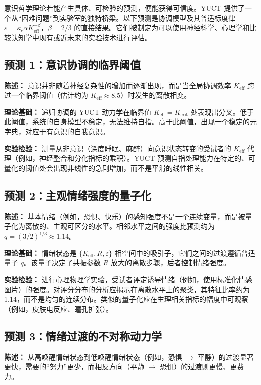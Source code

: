 \documentclass[12pt,a4paper]{article}
\begin{document}
	意识哲学理论若能产生具体、可检验的预测，便能获得可信度。YUCT 提供了一个从“困难问题”到实验室的独特桥梁。以下预测是协调模型及其普适标度律 \(\varepsilon = \kappa_c \alpha K_{\mathrm{eff}}^{-\beta}\)，\(\beta = 2/3\) 的直接结果。它们被制定为可以使用神经科学、心理学和比较认知学中现有或近未来的实验技术进行评估。
	
	\subsection{预测 1：意识协调的临界阈值}
	
	\textbf{陈述：} 意识并非随着神经复杂性的增加而逐渐出现，而是当全局协调效率 \(K_{\mathrm{eff}}\) 跨过一个临界阈值（估计约为 \(K_{\mathrm{eff}} \approx 8.5\)）时发生的离散相变。
	
	\textbf{理论基础：} 递归协调的 YUCT 动力学在临界值 \(K_{\mathrm{eff}} = K_{\mathrm{crit}}\) 处表现出分叉。低于此阈值，系统的自身模型不稳定，无法维持自指。高于此阈值，出现一个稳定的元字典，对应于有意识的自我意识。
	
	\textbf{实验检验：} 测量从非意识（深度睡眠、麻醉）向意识状态转变的受试者的 \(K_{\mathrm{eff}}\) 代理（例如，神经整合和分化指标的乘积）。YUCT 预测自指处理能力在特定的、可量化的阈值处会出现非线性的急剧增加，而不是平滑的线性相关。
	
	\subsection{预测 2：主观情绪强度的量子化}
	
	\textbf{陈述：} 基本情绪（例如，恐惧、快乐）的感知强度不是一个连续变量，而是被量子化为离散的、主观可区分的水平。相邻水平之间的强度比预测约为 \(q = (3/2)^{1/3} \approx 1.14\)。
	
	\textbf{理论基础：} 情绪状态是 \(\{K_{\mathrm{eff}}, R, \varepsilon\}\) 相空间中的吸引子，它们之间的过渡遵循普适量子 \(q\)。该量子决定了共振参数 \(R\) 放大的离散步骤，后者控制情绪强度。
	
	\textbf{实验检验：} 进行心理物理学实验，受试者评定诱导情绪（例如，使用标准化情感图片）的强度。对评分分布的分析应揭示在离散水平上的聚类，其特征比率约为 1.14，而不是均匀的连续分布。类似的量子化应在生理相关指标的幅度中可观察（例如，皮肤电反应、瞳孔扩张）。
	
	\subsection{预测 3：情绪过渡的不对称动力学}
	
	\textbf{陈述：} 从高唤醒情绪状态到低唤醒情绪状态（例如，恐惧 \(\rightarrow\) 平静）的过渡显著更快，需要的“努力”更少，而相反方向（平静 \(\rightarrow\) 恐惧）的过渡则更慢、更费力。
	
\end{document}
